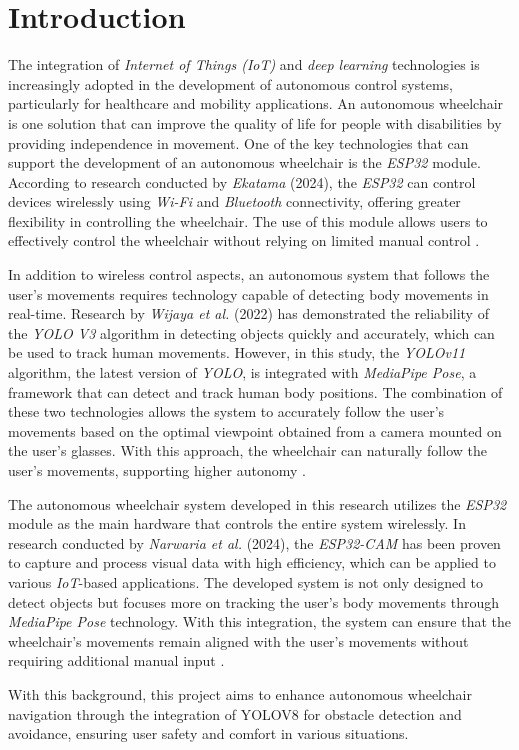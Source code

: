 \section{Introduction}
\label{sec:introduction}


The integration of \emph{Internet of Things (IoT)} and \emph{deep learning} technologies is increasingly adopted in the development of autonomous control systems, particularly for healthcare and mobility applications. An autonomous wheelchair is one solution that can improve the quality of life for people with disabilities by providing independence in movement. One of the key technologies that can support the development of an autonomous wheelchair is the \emph{ESP32} module. According to research conducted by \emph{Ekatama} (2024), the \emph{ESP32} can control devices wirelessly using \emph{Wi-Fi} and \emph{Bluetooth} connectivity, offering greater flexibility in controlling the wheelchair. The use of this module allows users to effectively control the wheelchair without relying on limited manual control \cite{ekatama2024perancangan}.

In addition to wireless control aspects, an autonomous system that follows the user's movements requires technology capable of detecting body movements in real-time. Research by \emph{Wijaya et al.} (2022) has demonstrated the reliability of the \emph{YOLO V3} algorithm in detecting objects quickly and accurately, which can be used to track human movements. However, in this study, the \emph{YOLOv11} algorithm, the latest version of \emph{YOLO}, is integrated with \emph{MediaPipe Pose}, a framework that can detect and track human body positions. The combination of these two technologies allows the system to accurately follow the user's movements based on the optimal viewpoint obtained from a camera mounted on the user's glasses. With this approach, the wheelchair can naturally follow the user's movements, supporting higher autonomy \cite{wijaya2022deteksi}.

The autonomous wheelchair system developed in this research utilizes the \emph{ESP32} module as the main hardware that controls the entire system wirelessly. In research conducted by \emph{Narwaria et al.} (2024), the \emph{ESP32-CAM} has been proven to capture and process visual data with high efficiency, which can be applied to various \emph{IoT}-based applications. The developed system is not only designed to detect objects but focuses more on tracking the user's body movements through \emph{MediaPipe Pose} technology. With this integration, the system can ensure that the wheelchair's movements remain aligned with the user's movements without requiring additional manual input \cite{10696374}.

With this background, this project aims to enhance autonomous wheelchair navigation through the integration of YOLOV8 for obstacle detection and avoidance, ensuring user safety and comfort in various situations.

